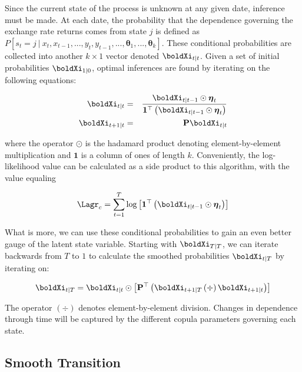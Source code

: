 Since the current state of the process is unknown at any given date, inference must be made. At each date, the probability that the dependence governing the exchange rate returns comes from state $j$ is defined as $P\left[s_{t}=j~|~x_{t},x_{t-1},...,y_{t},y_{t-1},...,\mathbf{\theta}_{1},...,\mathbf{\theta}_{k}\right]$. These conditional probabilities are collected into another $k\times 1$ vector denoted $\boldXi_{t|t}$. Given a set of initial probabilities $\boldXi_{1|0}$, optimal inferences are found by iterating on the following equations:

\begin{eqnarray}
	\boldXi_{t|t} &=& \frac{\boldXi_{t|t-1}\odot\boldsymbol{\eta}_{t}}{\mathbf{1}^{\top}\left(\boldXi_{t|t-1}\odot \boldsymbol{\eta}_{t}\right)} \\
	\boldXi_{t+1|t} &=& \mathbf{P} \boldXi_{t|t}
\end{eqnarray}

where the operator $\odot$ is the hadamard product denoting element-by-element multiplication and $\mathbf{1}$ is a column of ones of length $k$. Conveniently, the log-likelihood value can be calculated as a side product to this algorithm, with the value equaling

\begin{equation}
\Lagr_{c} = \sum_{t=1}^{T}\log \left[\mathbf{1}^{\top}\left(\boldXi_{t|t-1} \odot \boldsymbol{\eta}_{t}\right)\right] 
\end{equation}

What is more, we can use these conditional probabilities to gain an even better gauge of the latent state variable. Starting with $\boldXi_{T|T}$, we can iterate backwards from $T$ to $1$ to calculate the smoothed probabilities $\boldXi_{t|T}$ by iterating on:

\begin{equation} \label{eqn:Kim_smooth_probability}
	\boldXi_{t|T} = \boldXi_{t|t} \odot \left[\mathbf{P}^{\top}\left(\boldXi_{t+1|T}\left(\div\right)\boldXi_{t+1|t}\right)\right]
\end{equation}

The operator $\left(\div\right)$ denotes element-by-element division. Changes in dependence through time will be captured by the different copula parameters governing each state.

\subsection{Smooth Transition}

